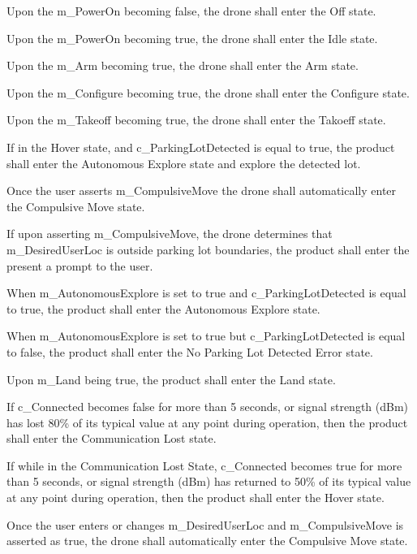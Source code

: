 \documentclass[12pt, titlepage]{article}
\begin{document}
\begin{todolist}
\begin{todolist}
    \item Upon the m\_PowerOn becoming false, the drone shall enter the Off state.
    \item Upon the m\_PowerOn becoming true, the drone shall enter the Idle state.
    \item Upon the m\_Arm becoming true, the drone shall enter the Arm state.
    \item Upon the m\_Configure becoming true, the drone shall enter the Configure state.
    \item Upon the m\_Takeoff becoming true, the drone shall enter the Takoeff state.
    \item If in the Hover state, and c\_ParkingLotDetected is equal to true, the product shall enter the Autonomous Explore state and explore the detected lot.
    \item Once the user asserts m\_CompulsiveMove the drone shall automatically enter the Compulsive Move state.
    \item If upon asserting m\_CompulsiveMove, the drone  determines that m\_DesiredUserLoc is outside parking lot boundaries, the product shall enter the present a prompt to the user.
    \item When m\_AutonomousExplore is set to true and c\_ParkingLotDetected is equal to true, the product shall enter the Autonomous Explore state.
    \item When m\_AutonomousExplore is set to true but c\_ParkingLotDetected is equal to false, the product shall enter the No Parking Lot Detected Error state.
    \item Upon m\_Land being true, the product shall enter the Land state.
    \item If c\_Connected becomes false for more than 5 seconds, or signal strength (dBm) has lost 80\% of its typical value at any point during operation, then the product shall enter the Communication Lost state.
    \item If while in the Communication Lost State, c\_Connected becomes true for more than 5 seconds, or signal strength (dBm) has returned to 50\% of its typical value at any point during operation, then the product shall enter the Hover state.
    \item Once the user enters or changes m\_DesiredUserLoc and m\_CompulsiveMove is asserted as true, the drone shall automatically enter the Compulsive Move state.
\end{todolist}
\end{todolist}
\end{document}
